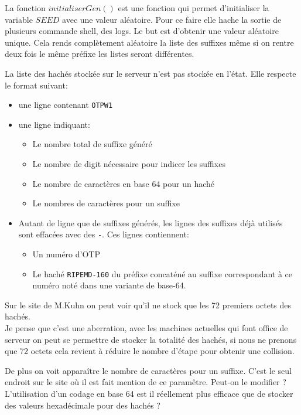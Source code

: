 \documentclass{../res/univ-projet}
\begin{document}
    La fonction $initialiserGen()$ est une fonction qui permet d'initialiser
    la variable $SEED$ avec une valeur aléatoire. Pour ce faire elle hache la sortie
    de plusieurs commande shell, des logs. Le but est d'obtenir une valeur aléatoire
    unique. Cela rends complètement aléatoire la liste des suffixes même si on rentre
    deux fois le même préfixe les listes seront différentes.

    La liste des hachés stockée sur le serveur n'est pas stockée en l'état. Elle respecte
    le format suivant:
    \begin{itemize}
        \item une ligne contenant \verb?OTPW1?
        \item une ligne indiquant:
            \begin{itemize}
                \item Le nombre total de suffixe généré
                \item Le nombre de digit nécessaire pour indicer les suffixes
                \item Le nombre de caractères en base 64 pour un haché
                \item Le nombres de caractères pour un suffixe
            \end{itemize}
        \item Autant de ligne que de suffixes générés, les lignes des
            suffixes déjà utilisés sont effacées avec des \verb?-?.
            Ces lignes contiennent:
            \begin{itemize}
                \item Un numéro d'OTP
                \item Le haché \verb?RIPEMD-160? du préfixe concaténé
                    au suffixe correspondant à ce numéro noté dans une variante de base-64.
            \end{itemize}
    \end{itemize}
    Sur le site de M.Kuhn on peut voir qu'il ne stock que les 72 premiers octets des hachés.\\
    Je pense que c'est une aberration, avec les machines actuelles qui font office de serveur
    on peut se permettre de stocker la totalité des hachés, si nous ne prenons que 72 octets
    cela revient à réduire le nombre d'étape pour obtenir une collision.
    
    De plus on voit apparaître le nombre de caractères pour un suffixe. C'est le seul endroit
    sur le site où il est fait mention de ce paramêtre. Peut-on le modifier ?\\
    L'utilisation d'un codage en base 64 est il réellement plus efficace que de stocker
    des valeurs hexadécimale pour des hachés ?
\end{document}
